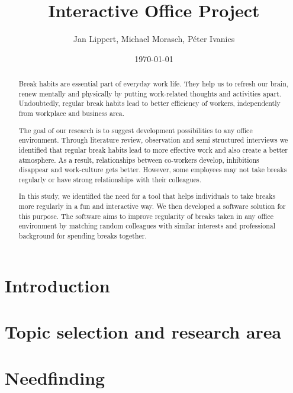 \documentclass[english]{tktltiki}
\begin{document}
\onehalfspacing

\title{Interactive Office Project}
\author{Jan Lippert, Michael Morasch, Péter Ivanics}
\date{\today}

\maketitle


\begin{abstract}
Break habits are essential part of everyday work life. They help us to refresh our brain, renew mentally and physically by putting work-related thoughts and activities apart. Undoubtedly, regular break habits lead to better efficiency of workers, independently from workplace and business area.

The goal of our research is to suggest development possibilities to any office environment. Through literature review, observation and semi structured interviews we identified that regular break habits lead to more effective work and also create a better atmosphere. As a result, relationships between co-workers develop, inhibitions disappear and work-culture gets better. However, some employees may not take breaks regularly or have strong relationships with their colleagues. 

In this study, we identified the need for a tool that helps individuals to take breaks more regularly in a fun and interactive way. We then developed a software solution for this purpose. The software aims to improve regularity of breaks taken in any office environment by matching random colleagues with similar interests and professional background for spending breaks together. 
\end{abstract}

\mytableofcontents

\section{Introduction}


\section{Topic selection and research area}


\section{Needfinding}
\end{document}
